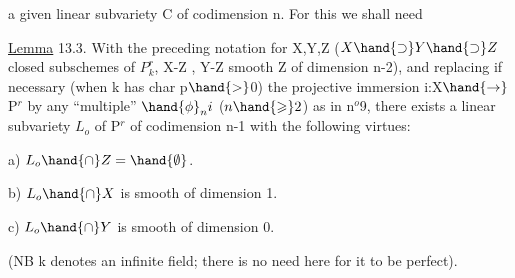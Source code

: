 
a given linear subvariety C of codimension n. For this
we shall need

\uline{Lemma} 13.3. With the preceding notation for  X,Y,Z ($X\hand{\supset} Y\hand{\supset} Z$
closed subschemes of $P^r_k$, X-Z\hand{,} ,
Y-Z smooth \hand{,} Z of dimension \hand{$\leqslant$}n-2), and replacing
if necessary (when k has char p$\hand{>}$0) the projective immersion
i:X$\hand{\rightarrow}$P$^r$ by any “multiple” $\hand{\phi}_n i$ ($n \hand{\geqslant} 2$) as in
n$^o$9, there exists a linear subvariety $L_o$ of P$^r$ of codimension
n-1 with the following virtues:

a) $L_o \hand{\cap} Z = \hand{\emptyset}$.

b) $L_o \hand{\cap} X$ is smooth of dimension 1.

c) $L_o \hand{\cap} Y$ is smooth of dimension 0.

(NB k denotes an infinite field; there is no need here for it to be perfect).

